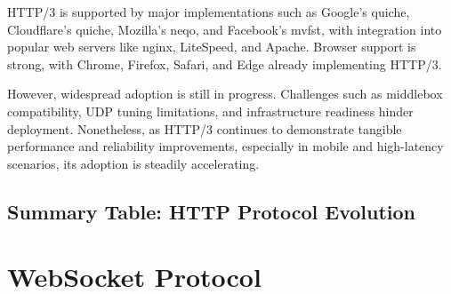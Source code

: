 HTTP/3 is supported by major implementations such as Google’s quiche, Cloudflare’s quiche, Mozilla’s neqo, and Facebook’s mvfst, with integration into popular web servers like nginx, LiteSpeed, and Apache. Browser support is strong, with Chrome, Firefox, Safari, and Edge already implementing HTTP/3.

However, widespread adoption is still in progress. Challenges such as middlebox compatibility, UDP tuning limitations, and infrastructure readiness hinder deployment. Nonetheless, as HTTP/3 continues to demonstrate tangible performance and reliability improvements, especially in mobile and high-latency scenarios, its adoption is steadily accelerating.


\subsection{Summary Table: HTTP Protocol Evolution}

\begin{table}[H]
\centering
{}
\caption{Evolution of HTTP protocol features across versions}
\end{table}


\section{WebSocket Protocol}

